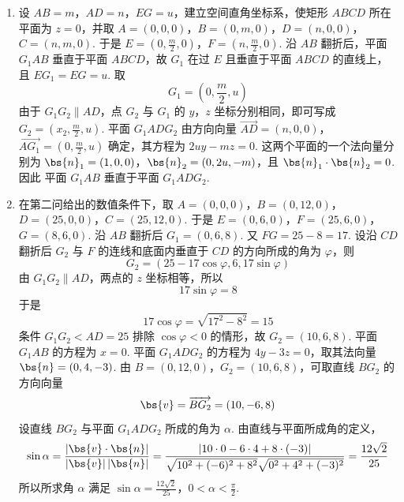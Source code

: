 \begin{solution}
\begin{enumerate}
\item
设 \(AB=m\)，\(AD=n\)，\(EG=u\)，建立空间直角坐标系，使矩形 \(ABCD\) 所在平面为 \(z=0\)，并取 \(A=(0,0,0)\)，\(B=(0,m,0)\)，\(D=(n,0,0)\)，\(C=(n,m,0)\). 于是 \(E=\left(0,\frac{m}{2},0\right)\)，\(F=\left(n,\frac{m}{2},0\right)\).
沿 \(AB\) 翻折后，平面 \(G_1AB\) 垂直于平面 \(ABCD\)，故 \(G_1\) 在过 \(E\) 且垂直于平面 \(ABCD\) 的直线上，且 \(EG_1=EG=u\). 取
\[
G_1=\left(0,\frac{m}{2},u\right)
\]
由于 \(G_1G_2\parallel AD\)，点 \(G_2\) 与 \(G_1\) 的 \(y\)，\(z\) 坐标分别相同，即可写成 \(G_2=(x_2,\frac{m}{2},u)\). 平面 \(G_1ADG_2\) 由方向向量 \(\overrightarrow{AD}=(n,0,0)\)，\(\overrightarrow{AG_1}=\left(0,\frac{m}{2},u\right)\) 确定，其方程为 \(2uy-mz=0\). 这两个平面的一个法向量分别为 \(\bs{n}_1=(1,0,0)\)，\(\bs{n}_2=(0,2u,-m)\)，且 \(\bs{n}_1\cdot\bs{n}_2=0\). 因此
平面 \(G_1AB\) 垂直于平面 \(G_1ADG_2\).

\item
在第二问给出的数值条件下，取 \(A=(0,0,0)\)，\(B=(0,12,0)\)，\(D=(25,0,0)\)，\(C=(25,12,0)\). 于是 \(E=(0,6,0)\)，\(F=(25,6,0)\)，\(G=(8,6,0)\).
沿 \(AB\) 翻折后 \(G_1=(0,6,8)\). 又 \(FG=25-8=17\). 设沿 \(CD\) 翻折后 \(G_2\) 与 \(F\) 的连线和底面内垂直于 \(CD\) 的方向所成的角为 \(\varphi\)，则
\[
G_2=(25-17\cos\varphi,6,17\sin\varphi)
\]
由 \(G_1G_2\parallel AD\)，两点的 \(z\) 坐标相等，所以
\[
17\sin\varphi=8
\]
于是
\[
17\cos\varphi=\sqrt{17^2-8^2}=15
\]
条件 \(G_1G_2<AD=25\) 排除 \(\cos\varphi<0\) 的情形，故 \(G_2=(10,6,8)\). 平面 \(G_1AB\) 的方程为 \(x=0\). 平面 \(G_1ADG_2\) 的方程为 \(4y-3z=0\)，取其法向量 \(\bs{n}=(0,4,-3)\).
由 \(B=(0,12,0)\)，\(G_2=(10,6,8)\)，可取直线 \(BG_2\) 的方向向量
\[
\bs{v}=\overrightarrow{BG_2}=(10,-6,8)
\]
设直线 \(BG_2\) 与平面 \(G_1ADG_2\) 所成的角为 \(\alpha\). 由直线与平面所成角的定义，
\[
\sin\alpha
=\frac{|\bs{v}\cdot\bs{n}|}{|\bs{v}|\,|\bs{n}|}
=\frac{|10\cdot0-6\cdot4+8\cdot(-3)|}
{\sqrt{10^2+(-6)^2+8^2}\sqrt{0^2+4^2+(-3)^2}}
=\frac{12\sqrt{2}}{25}
\]
所以所求角 \(\alpha\) 满足
\(\sin\alpha=\frac{12\sqrt{2}}{25}\)，\(0<\alpha<\frac{\pi}{2}\).
\end{enumerate}
\end{solution}

